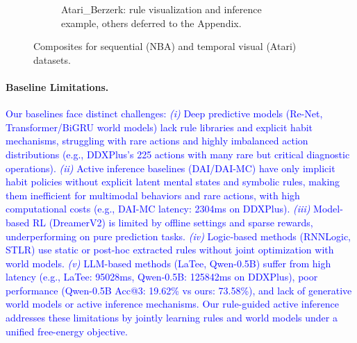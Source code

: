 \documentclass{article} %
\newcommand{\revise}[1]{\textcolor{blue}{#1}}
\begin{document}
\begin{figure}[t]
\begin{subfigure}[t]{\linewidth}
    \caption{Atari\_Berzerk: rule visualization and inference example, others deferred to the Appendix.}
    \label{fig:atari_composite}
  \end{subfigure}

  \caption{Composites for sequential (NBA) and temporal visual (Atari) datasets.}
  \label{fig:composite_all}
\end{figure}



\paragraph{Baseline Limitations.}
\revise{Our baselines face distinct challenges: \emph{(i)} Deep predictive models (Re-Net, Transformer/BiGRU world models) lack rule libraries and explicit habit mechanisms, struggling with rare actions and highly imbalanced action distributions (e.g., DDXPlus's 225 actions with many rare but critical diagnostic operations). \emph{(ii)} Active inference baselines (DAI/DAI-MC) have only implicit habit policies without explicit latent mental states and symbolic rules, making them inefficient for multimodal behaviors and rare actions, with high computational costs (e.g., DAI-MC latency: 2304ms on DDXPlus). \emph{(iii)} Model-based RL (DreamerV2) is limited by offline settings and sparse rewards, underperforming on pure prediction tasks. \emph{(iv)} Logic-based methods (RNNLogic, STLR) use static or post-hoc extracted rules without joint optimization with world models. \emph{(v)} LLM-based methods (LaTee, Qwen-0.5B) suffer from high latency (e.g., LaTee: 95028ms, Qwen-0.5B: 125842ms on DDXPlus), poor performance (Qwen-0.5B Acc@3: 19.62\% vs ours: 73.58\%), and lack of generative world models or active inference mechanisms. Our rule-guided active inference addresses these limitations by jointly learning rules and world models under a unified free-energy objective.}


\end{document}
